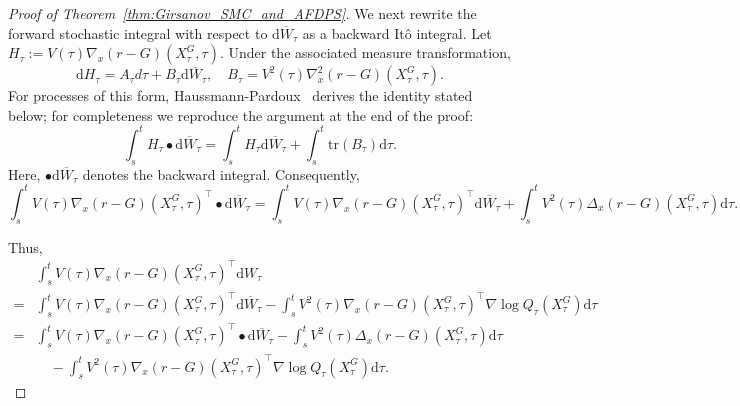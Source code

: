 \documentclass{article}
\theoremstyle{plain}
\theoremstyle{definition}
\theoremstyle{remark}
\newcommand{\dif}{{\mathrm{d}}}
\begin{document}
\begin{proof}[Proof of Theorem~\ref{thm:Girsanov_SMC_and_AFDPS}]
We next rewrite the forward stochastic integral with respect to \(\dif \overline W_\tau\) as a backward It\^o integral. Let \(H_\tau := V(\tau)\nabla_x(r-G)(X_\tau^G,\tau)\). Under the associated measure transformation,
\[
\dif H_\tau = A_\tau d\tau + B_\tau\dif \overline W_\tau, \quad 
B_\tau = V^2(\tau)\nabla_x^2(r-G)(X_\tau^G,\tau).
\]
For processes of this form, Haussmann-Pardoux~\cite{haussmann1986time} derives the identity stated below; for completeness we reproduce the argument at the end of the proof:
\begin{equation}
\int_s^t H_\tau \bullet \dif \overline W_\tau
= \int_s^t H_\tau \dif \overline W_\tau
  + \int_s^t \mathrm{tr}(B_\tau) \dif \tau.
\label{eq:transformation of integral direction}
\end{equation}
Here, \(\bullet \dif\overline{W}_\tau\) denotes the backward integral. Consequently,
\[
\int_s^t V(\tau)\nabla_x(r-G)(X_\tau^G,\tau)^{\top}\bullet \dif \overline W_\tau
= \int_s^t V(\tau)\nabla_x(r-G)(X_\tau^G,\tau)^{\top} \dif \overline W_\tau
  + \int_s^t V^2(\tau)\Delta_x(r-G)(X_\tau^G,\tau)\dif \tau.
\]

Thus,
\begin{align}
&\int_s^t V(\tau)\nabla_x (r-G)(X_\tau^G,\tau)^{\top} \dif W_\tau \nonumber\\
=& \int_s^t V(\tau)\nabla_x (r-G)(X_\tau^G,\tau)^{\top} \dif \overline W_\tau
    - \int_s^t V^2(\tau)\nabla_x (r-G)(X_\tau^G,\tau)^{\top}\nabla \log Q_\tau(X_\tau^G)\dif \tau \nonumber\\
=& \int_s^t V(\tau)\nabla_x (r-G)(X_\tau^G,\tau)^{\top} \bullet \dif \overline W_\tau
    - \int_s^t V^2(\tau)\Delta_x(r-G)(X_\tau^G,\tau)\dif \tau \nonumber\\
&\quad - \int_s^t V^2(\tau)\nabla_x (r-G)(X_\tau^G,\tau)^{\top}\nabla\log Q_\tau(X_\tau^G)\dif \tau.
\label{simplification_of_first_term}
\end{align}


\end{proof}
\end{document}
